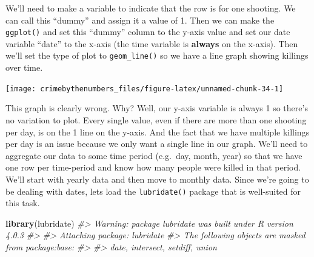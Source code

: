 \documentclass[
  12pt,
]{book}
\newenvironment{Shaded}{\begin{snugshade}}{\end{snugshade}}
\newcommand{\CommentTok}[1]{\textcolor[rgb]{0.37,0.37,0.37}{\textit{#1}}}
\newcommand{\DataTypeTok}[1]{\textcolor[rgb]{0.27,0.27,0.27}{#1}}
\newcommand{\DecValTok}[1]{\textcolor[rgb]{0.06,0.06,0.06}{#1}}
\newcommand{\KeywordTok}[1]{\textcolor[rgb]{0.27,0.27,0.27}{\textbf{#1}}}
\newcommand{\NormalTok}[1]{#1}
\newcommand{\OperatorTok}[1]{\textcolor[rgb]{0.43,0.43,0.43}{\textbf{#1}}}
\newcommand{\StringTok}[1]{\textcolor[rgb]{0.5,0.5,0.5}{#1}}
\begin{document}
We'll need to make a variable to indicate that the row is for one shooting. We can call this ``dummy'' and assign it a value of 1. Then we can make the \texttt{ggplot()} and set this ``dummy'' column to the y-axis value and set our date variable ``date'' to the x-axis (the time variable is \textbf{always} on the x-axis). Then we'll set the type of plot to \texttt{geom\_line()} so we have a line graph showing killings over time.

\begin{Shaded}
\end{Shaded}

\begin{center}\texttt{[image: crimebythenumbers\_files/figure-latex/unnamed-chunk-34-1]} \end{center}

This graph is clearly wrong. Why? Well, our y-axis variable is always 1 so there's no variation to plot. Every single value, even if there are more than one shooting per day, is on the 1 line on the y-axis. And the fact that we have multiple killings per day is an issue because we only want a single line in our graph. We'll need to aggregate our data to some time period (e.g.~day, month, year) so that we have one row per time-period and know how many people were killed in that period. We'll start with yearly data and then move to monthly data. Since we're going to be dealing with dates, lets load the \texttt{lubridate()} package that is well-suited for this task.

\begin{Shaded}
\begin{Highlighting}[]
\KeywordTok{library}\NormalTok{(lubridate)}
\CommentTok{\#\textgreater{} Warning: package \textquotesingle{}lubridate\textquotesingle{} was built under R version 4.0.3}
\CommentTok{\#\textgreater{} }
\CommentTok{\#\textgreater{} Attaching package: \textquotesingle{}lubridate\textquotesingle{}}
\CommentTok{\#\textgreater{} The following objects are masked from \textquotesingle{}package:base\textquotesingle{}:}
\CommentTok{\#\textgreater{} }
\CommentTok{\#\textgreater{}     date, intersect, setdiff, union}
\end{Highlighting}
\end{Shaded}
\end{document}
